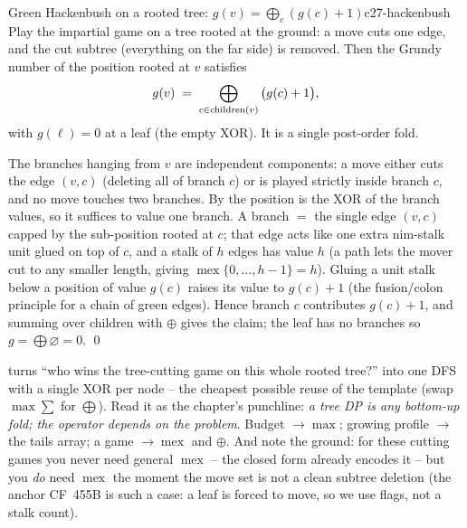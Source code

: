 \begin{theorem}{Green Hackenbush on a rooted tree: $g(v) = \bigoplus_c (g(c) + 1)$}{c27-hackenbush}
Play the impartial game on a tree rooted at the ground: a move cuts one edge, and the
cut subtree (everything on the far side) is removed. Then the Grundy number of the
position rooted at $v$ satisfies
\[
  g(v) \;=\; \bigoplus_{c \in \operatorname{children}(v)} \big(g(c) + 1\big),
\]
with $g(\ell) = 0$ at a leaf (the empty XOR). It is a single post-order fold.
\end{theorem}
\begin{proofbox}
The branches hanging from $v$ are independent components: a move either cuts the edge
$(v, c)$ (deleting all of branch $c$) or is played strictly inside branch $c$, and no
move touches two branches. By  the position is the XOR of the
branch values, so it suffices to value one branch. A branch $=$ the single edge $(v,c)$
capped by the sub-position rooted at $c$; that edge acts like one extra nim-stalk unit
glued on top of $c$, and a stalk of $h$ edges has value $h$ (a path lets the mover cut
to any smaller length, giving $\operatorname{mex}\{0, \dots, h-1\} = h$). Gluing a unit stalk below a
position of value $g(c)$ raises its value to $g(c) + 1$ (the fusion/colon principle for
a chain of green edges). Hence branch $c$ contributes $g(c) + 1$, and summing over
children with $\oplus$ gives the claim; the leaf has no branches so $g = \bigoplus
\varnothing = 0$. \qed
\end{proofbox}

\begin{insightbox}
 turns ``who wins the tree-cutting game on this whole rooted tree?''
into one DFS with a single XOR per node -- the cheapest possible reuse of the
 template (swap $\max\!\sum$ for $\bigoplus$). Read it as the
chapter's punchline: \emph{a tree DP is any bottom-up fold; the operator depends on the
problem}. Budget $\to \max$; growing profile $\to$ the tails array; a game $\to \operatorname{mex}$ and
$\oplus$. And note the ground: for these cutting games you never need general $\operatorname{mex}$ --
the closed form already encodes it -- but you \emph{do} need $\operatorname{mex}$ the moment the move
set is not a clean subtree deletion (the anchor CF~455B is such a case: a leaf is forced
to move, so we use flags, not a stalk count).
\end{insightbox}

